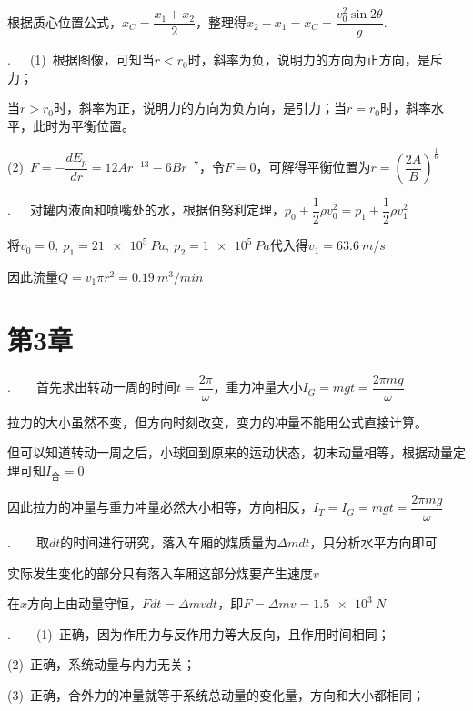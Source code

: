 根据质心位置公式，$x_C=\dfrac{x_1+x_2}{2}$，整理得$x_2-x_1=x_C=\dfrac{v_0^2\sin{2\theta}}{g}$.

\noindent\hdashrule{\textwidth}{1pt}{1pt}

.~~~(1)~根据图像，可知当$r<r_0$时，斜率为负，说明力的方向为正方向，是斥力；

当$r>r_0$时，斜率为正，说明力的方向为负方向，是引力；当$r=r_0$时，斜率水平，此时为平衡位置。

(2)~$F=-\dfrac{dE_p}{dr}=12Ar^{-13}-6Br^{-7}$，令$F=0$，可解得平衡位置为$r=\left(\dfrac{2A}{B}\right)^{\frac{1}{6}}$

\noindent\hdashrule{\textwidth}{1pt}{1pt}

.~~~对罐内液面和喷嘴处的水，根据伯努利定理，$p_0+\dfrac{1}{2}\rho v_0^2=p_1+\dfrac{1}{2}\rho v_1^2$

将$v_0=0,~p_1=\SI{21e5}{Pa},~p_2=\SI{1e5}{Pa}$代入得$v_1=\SI{63.6}{m/s}$

因此流量$Q=v_1\pi r^2=\SI{0.19}{m^3/min}$

\section*{第3章}

.~~~~首先求出转动一周的时间$t=\dfrac{2\pi}{\omega}$，重力冲量大小$I_G=mgt=\dfrac{2\pi mg}{\omega}$

拉力的大小虽然不变，但方向时刻改变，变力的冲量不能用公式直接计算。

但可以知道转动一周之后，小球回到原来的运动状态，初末动量相等，根据动量定理可知$I_{\text{合}}=0$

因此拉力的冲量与重力冲量必然大小相等，方向相反，$I_T=I_G=mgt=\dfrac{2\pi mg}{\omega}$

\noindent\hdashrule{\textwidth}{1pt}{1pt}

.~~~~取$dt$的时间进行研究，落入车厢的煤质量为$\Delta m dt$，只分析水平方向即可

实际发生变化的部分只有落入车厢这部分煤要产生速度$v$

在$x$方向上由动量守恒，$F dt=\Delta mv dt$，即$F=\Delta mv=\SI{1.5e3}{N}$

\noindent\hdashrule{\textwidth}{1pt}{1pt}

.~~~~(1)~正确，因为作用力与反作用力等大反向，且作用时间相同；

(2)~正确，系统动量与内力无关；

(3)~正确，合外力的冲量就等于系统总动量的变化量，方向和大小都相同；


